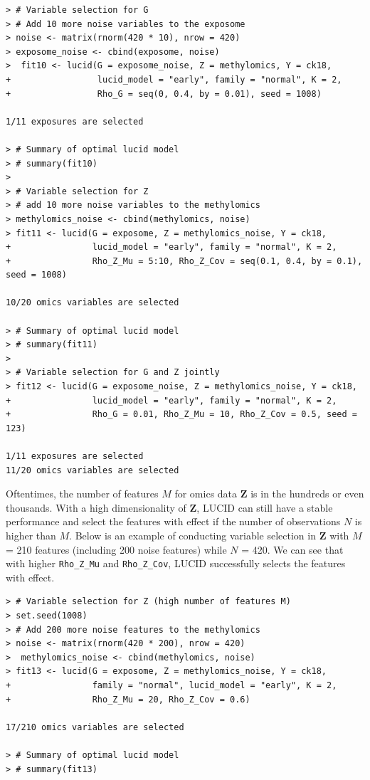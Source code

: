 \begin{verbatim}
> # Variable selection for G
> # Add 10 more noise variables to the exposome
> noise <- matrix(rnorm(420 * 10), nrow = 420)
> exposome_noise <- cbind(exposome, noise)
>  fit10 <- lucid(G = exposome_noise, Z = methylomics, Y = ck18, 
+                 lucid_model = "early", family = "normal", K = 2,
+                 Rho_G = seq(0, 0.4, by = 0.01), seed = 1008)

1/11 exposures are selected

> # Summary of optimal lucid model
> # summary(fit10)
> 
> # Variable selection for Z
> # add 10 more noise variables to the methylomics
> methylomics_noise <- cbind(methylomics, noise)
> fit11 <- lucid(G = exposome, Z = methylomics_noise, Y = ck18, 
+                lucid_model = "early", family = "normal", K = 2,
+                Rho_Z_Mu = 5:10, Rho_Z_Cov = seq(0.1, 0.4, by = 0.1), seed = 1008)

10/20 omics variables are selected  

> # Summary of optimal lucid model
> # summary(fit11)
> 
> # Variable selection for G and Z jointly
> fit12 <- lucid(G = exposome_noise, Z = methylomics_noise, Y = ck18, 
+                lucid_model = "early", family = "normal", K = 2,
+                Rho_G = 0.01, Rho_Z_Mu = 10, Rho_Z_Cov = 0.5, seed = 123)

1/11 exposures are selected 
11/20 omics variables are selected 
\end{verbatim}

Oftentimes, the number of features \(M\) for omics data
\(\boldsymbol{\mathbf{Z}}\) is in the hundreds or even thousands. With a
high dimensionality of \(\boldsymbol{\mathbf{Z}}\), LUCID can still have a
stable performance and select the features with effect if the number of
observations \(N\) is higher than \(M\). Below is an example of conducting
variable selection in \(\boldsymbol{\mathbf{Z}}\) with \(M\) = 210 features
(including 200 noise features) while \(N\) = 420. We can see that with
higher \texttt{Rho\_Z\_Mu} and \texttt{Rho\_Z\_Cov}, LUCID successfully selects the
features with effect.

\begin{verbatim}
> # Variable selection for Z (high number of features M)
> set.seed(1008)
> # Add 200 more noise features to the methylomics
> noise <- matrix(rnorm(420 * 200), nrow = 420)
>  methylomics_noise <- cbind(methylomics, noise)
> fit13 <- lucid(G = exposome, Z = methylomics_noise, Y = ck18, 
+                family = "normal", lucid_model = "early", K = 2,
+                Rho_Z_Mu = 20, Rho_Z_Cov = 0.6)

17/210 omics variables are selected 

> # Summary of optimal lucid model
> # summary(fit13)
\end{verbatim}


